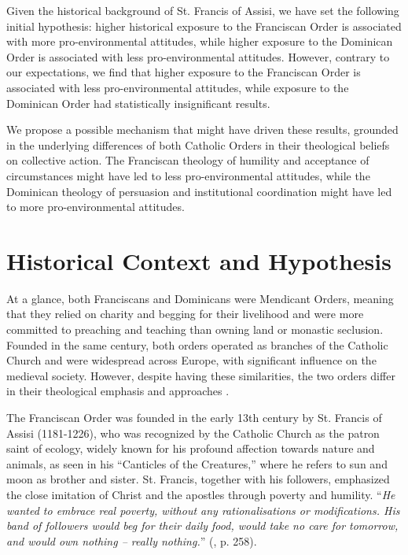 \documentclass[12pt, a4paper]{article}
\begin{document}
Given the historical background of St. Francis of Assisi, we have set the following initial hypothesis: higher 
historical exposure to the Franciscan Order is associated with more pro-environmental attitudes, while higher exposure 
to the Dominican Order is associated with less pro-environmental attitudes. However, contrary to our expectations, 
we find that higher exposure to the Franciscan Order is associated with less pro-environmental attitudes, while 
exposure to the Dominican Order had statistically insignificant results.

We propose a possible mechanism that might have driven these results, grounded in the underlying differences of
both Catholic Orders in their theological beliefs on collective action. The Franciscan theology of humility and acceptance 
of circumstances might have led to less pro-environmental attitudes, while the Dominican theology of persuasion and 
institutional coordination might have led to more pro-environmental attitudes.

\section{Historical Context and Hypothesis}

At a glance, both Franciscans and Dominicans were Mendicant Orders, meaning that they relied on charity and begging for their livelihood and were more committed to preaching and teaching than owning land or monastic seclusion. Founded in the same century, both orders operated as branches of the Catholic Church and were widespread across Europe, with significant influence on
the medieval society. However, despite having these similarities, the two orders differ in their theological emphasis and approaches \parencite{arrunada2024}.

The Franciscan Order was founded in the early 13th century by
St. Francis of Assisi (1181-1226), who was recognized by the
Catholic Church as the patron saint of ecology, widely known
for his profound affection towards nature and animals, as seen in his ``Canticles of the Creatures,'' where he refers to sun and moon as brother and sister. St. Francis, together with his followers, emphasized the close imitation of Christ and the apostles through poverty and humility. ``\textit{He wanted to embrace real poverty, without any rationalisations or modifications. His band of followers would beg for their daily food, would take no care for tomorrow, and would own nothing – really nothing.}'' (\cite{lynch2014}, p. 258).
\end{document}
